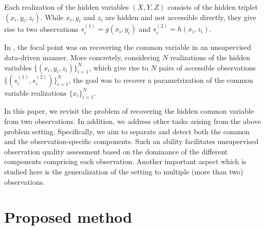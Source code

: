 \documentclass[]{article}
\theoremstyle{definition}
\begin{document}
Each realization of the hidden variables $(X,Y,Z)$ consists of the hidden triplet $(x_i,y_i,z_i)$.
While $x_i,y_i$ and $z_i$ are hidden and not accessible directly, they give rise to two observations $s^{(1)}_i = g(x_i,y_i)$ and $s^{(2)}_i = h(x_i,z_i)$.
	
In \cite{TODO}, the focal point was on recovering the common variable in an unsupervised data-driven manner. More concretely, considering $N$ realizations of the hidden variables $\{(x_i,y_i,z_i)\}_{i=1}^N$, which give rise to $N$ pairs of accessible observations $\{(s^{(1)}_i,s^{(2)}_i)\}_{i=1}^N$, the goal was to recover a parametrization of the common variable realizations $\{x_i\}_{i=1}^N$. 
	
In this paper, we revisit the problem of recovering the hidden common variable from two observations. In addition, we address other tasks arising from the above problem setting. Specifically, we aim to separate and detect both the common and the observation-specific components. Such an ability facilitates unsupervised observation quality assessment based on the dominance of the different components comprising each observation. Another important aspect which is studied here is the generalization of the setting to multiple (more than two) observations.
	
\section{Proposed method}
\end{document}
